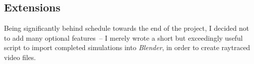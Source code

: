 \subsection{Extensions\label{extensions}}

Being significantly behind schedule towards the end of the project, I decided not to add many
optional features~-- I merely wrote a short but exceedingly useful script to import completed
simulations into \textsl{Blender}, in order to create raytraced video files.
